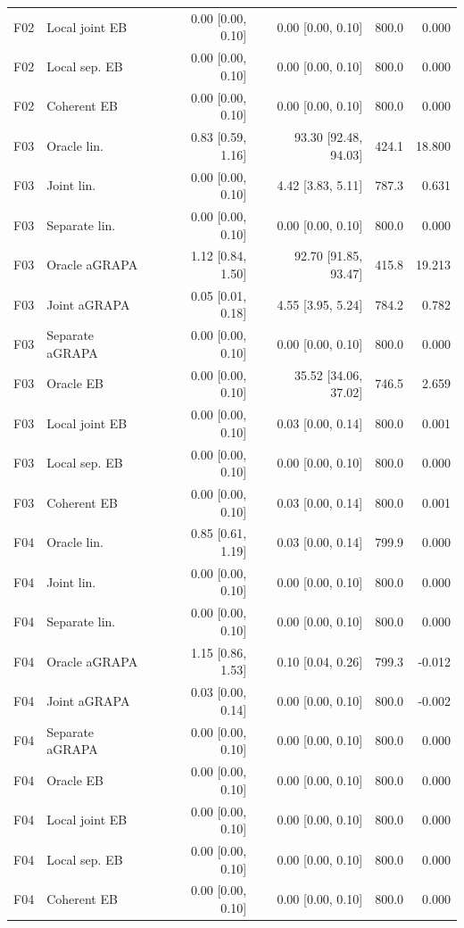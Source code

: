 \begin{longtable}{llrrrr}
F02 & Local joint EB & 0.00 [0.00, 0.10] & 0.00 [0.00, 0.10] & 800.0 & 0.000\\
F02 & Local sep. EB & 0.00 [0.00, 0.10] & 0.00 [0.00, 0.10] & 800.0 & 0.000\\
F02 & Coherent EB & 0.00 [0.00, 0.10] & 0.00 [0.00, 0.10] & 800.0 & 0.000\\
F03 & Oracle lin. & 0.83 [0.59, 1.16] & 93.30 [92.48, 94.03] & 424.1 & 18.800\\
F03 & Joint lin. & 0.00 [0.00, 0.10] & 4.42 [3.83, 5.11] & 787.3 & 0.631\\
F03 & Separate lin. & 0.00 [0.00, 0.10] & 0.00 [0.00, 0.10] & 800.0 & 0.000\\
F03 & Oracle aGRAPA & 1.12 [0.84, 1.50] & 92.70 [91.85, 93.47] & 415.8 & 19.213\\
F03 & Joint aGRAPA & 0.05 [0.01, 0.18] & 4.55 [3.95, 5.24] & 784.2 & 0.782\\
F03 & Separate aGRAPA & 0.00 [0.00, 0.10] & 0.00 [0.00, 0.10] & 800.0 & 0.000\\
F03 & Oracle EB & 0.00 [0.00, 0.10] & 35.52 [34.06, 37.02] & 746.5 & 2.659\\
F03 & Local joint EB & 0.00 [0.00, 0.10] & 0.03 [0.00, 0.14] & 800.0 & 0.001\\
F03 & Local sep. EB & 0.00 [0.00, 0.10] & 0.00 [0.00, 0.10] & 800.0 & 0.000\\
F03 & Coherent EB & 0.00 [0.00, 0.10] & 0.03 [0.00, 0.14] & 800.0 & 0.001\\
F04 & Oracle lin. & 0.85 [0.61, 1.19] & 0.03 [0.00, 0.14] & 799.9 & 0.000\\
F04 & Joint lin. & 0.00 [0.00, 0.10] & 0.00 [0.00, 0.10] & 800.0 & 0.000\\
F04 & Separate lin. & 0.00 [0.00, 0.10] & 0.00 [0.00, 0.10] & 800.0 & 0.000\\
F04 & Oracle aGRAPA & 1.15 [0.86, 1.53] & 0.10 [0.04, 0.26] & 799.3 & -0.012\\
F04 & Joint aGRAPA & 0.03 [0.00, 0.14] & 0.00 [0.00, 0.10] & 800.0 & -0.002\\
F04 & Separate aGRAPA & 0.00 [0.00, 0.10] & 0.00 [0.00, 0.10] & 800.0 & 0.000\\
F04 & Oracle EB & 0.00 [0.00, 0.10] & 0.00 [0.00, 0.10] & 800.0 & 0.000\\
F04 & Local joint EB & 0.00 [0.00, 0.10] & 0.00 [0.00, 0.10] & 800.0 & 0.000\\
F04 & Local sep. EB & 0.00 [0.00, 0.10] & 0.00 [0.00, 0.10] & 800.0 & 0.000\\
F04 & Coherent EB & 0.00 [0.00, 0.10] & 0.00 [0.00, 0.10] & 800.0 & 0.000\\

\end{longtable}
